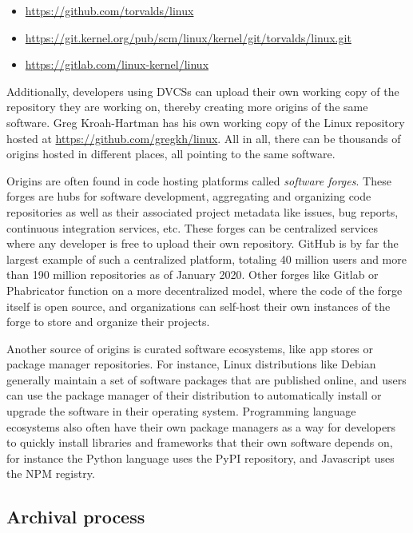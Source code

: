 \begin{itemize}[ ]
    \setlength\itemsep{-0.5em}
    \item \url{https://github.com/torvalds/linux}
    \item \url{https://git.kernel.org/pub/scm/linux/kernel/git/torvalds/linux.git}
    \item \url{https://gitlab.com/linux-kernel/linux}
\end{itemize}

Additionally, developers using \glspl{DVCS} can upload their own working copy of
the repository they are working on, thereby creating more origins of the same
software. Greg Kroah-Hartman has his own working copy of the Linux repository
hosted at \url{https://github.com/gregkh/linux}. All in all, there can be
thousands of origins hosted in different places, all pointing to the same
software.

Origins are often found in code hosting platforms called \emph{software
forges}. These forges are hubs for software development, aggregating and
organizing code repositories as well as their associated project metadata like
issues, bug reports, continuous integration services, etc.  These forges can be
centralized services where any developer is free to upload their own
repository. GitHub is by far the largest example of such a centralized
platform, totaling 40 million users and more than 190 million repositories as
of January 2020. Other forges like Gitlab or Phabricator function on a more
decentralized model, where the code of the forge itself is open source, and
organizations can self-host their own instances of the forge to store and
organize their projects.

Another source of origins is curated software ecosystems, like app stores or
package manager repositories. For instance, Linux distributions like Debian
generally maintain a set of software packages that are published online, and
users can use the package manager of their distribution to automatically
install or upgrade the software in their operating system. Programming language
ecosystems also often have their own package managers as a way for developers
to quickly install libraries and frameworks that their own software depends on,
for instance the Python language uses the PyPI repository, and Javascript uses
the NPM registry.

\subsection{Archival process}

